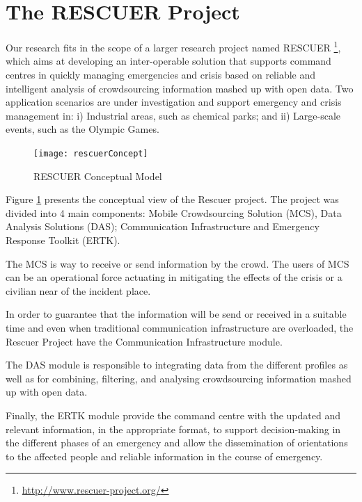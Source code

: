 \label{cap:3}

\section{The RESCUER Project}

Our research fits in the scope of a larger research project named RESCUER \footnote{\url{http://www.rescuer-project.org/}}, which aims at developing an inter-operable solution that supports command centres in quickly managing emergencies and crisis based on reliable and intelligent analysis of crowdsourcing information mashed up with open data. Two application scenarios are under investigation and support emergency and crisis management in: i) Industrial areas, such as chemical parks; and ii) Large-scale events, such as the Olympic Games.

\begin{figure}[htb]
\begin{center}
  \texttt{[image: rescuerConcept]}
\caption{RESCUER Conceptual Model}
\label{fig:rescuerConcept}
\end{center}
\end{figure}

Figure \ref{fig:rescuerConcept} presents the conceptual view of the Rescuer project. The project was divided into 4 main components: Mobile Crowdsourcing Solution (MCS), Data Analysis Solutions (DAS); Communication Infrastructure and Emergency Response Toolkit (ERTK). 

The MCS is way to receive or send information by the crowd. The users of MCS can be an operational force actuating in mitigating the effects of the crisis or a civilian near of the incident place.

In order to guarantee that the information will be send or received in a suitable time and even when traditional communication infrastructure are overloaded, the Rescuer Project have the Communication Infrastructure module.

The DAS module is responsible to integrating data from the different profiles as well as for combining, filtering, and analysing crowdsourcing information mashed up with open data. 

Finally, the ERTK module provide the command centre with the updated and relevant information, in the appropriate format, to support decision-making in the different phases of an emergency and allow the dissemination of orientations to the affected people and reliable information in the course of emergency.





